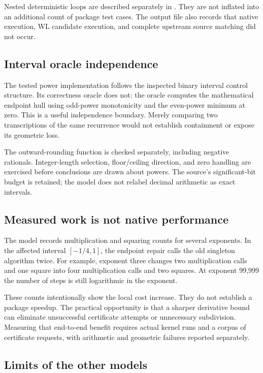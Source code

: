 \documentclass[11pt,letterpaper]{article}
\newcommand{\code}[1]{\texttt{\detokenize{#1}}}
\begin{document}
Nested deterministic loops are described separately in \code{independent-results.json}. They are not inflated into an additional count of package test cases. The output file also records that native execution, WL candidate execution, and complete upstream source matching did not occur.

\subsection{Interval oracle independence}

The tested power implementation follows the inspected binary interval control structure. Its correctness oracle does not: the oracle computes the mathematical endpoint hull using odd-power monotonicity and the even-power minimum at zero. This is a useful independence boundary. Merely comparing two transcriptions of the same recurrence would not establish containment or expose its geometric loss.

The outward-rounding function is checked separately, including negative rationals. Integer-length selection, floor/ceiling direction, and zero handling are exercised before conclusions are drawn about powers. The source's significant-bit budget is retained; the model does not relabel decimal arithmetic as exact intervals.

\subsection{Measured work is not native performance}

The model records multiplication and squaring counts for several exponents. In the affected interval $[-1/4,1]$, the endpoint repair calls the old singleton algorithm twice. For example, exponent three changes two multiplication calls and one square into four multiplication calls and two squares. At exponent 99,999 the number of steps is still logarithmic in the exponent.

These counts intentionally show the local cost increase. They do not establish a package speedup. The practical opportunity is that a sharper derivative bound can eliminate unsuccessful certificate attempts or unnecessary subdivision. Measuring that end-to-end benefit requires actual kernel runs and a corpus of certificate requests, with arithmetic and geometric failures reported separately.

\subsection{Limits of the other models}
\end{document}
